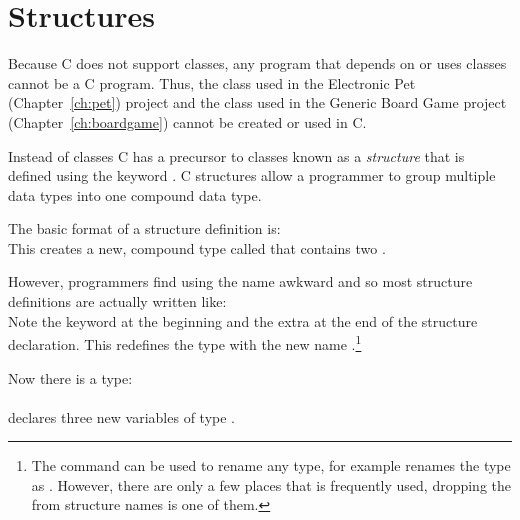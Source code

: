 \chapter{Structures}\label{appendix:structures}

Because C does not support classes, any program that depends on or uses classes cannot be a C program.   Thus, the  class used in the Electronic Pet (Chapter~\ref{ch:pet}) project and the   class used in the Generic Board Game project (Chapter~\ref{ch:boardgame}) cannot be created or used in C.  

Instead of classes C has a precursor to classes known as a \emph{structure} that is defined using the keyword .  C structures allow a programmer to group multiple data types into one compound data type. 

The basic format of a structure definition is:\\
This creates a new, compound type called  that contains two .

However, programmers find using the name  awkward and so most structure definitions are actually written like:\\
Note the keyword  at the beginning and the extra  at the end of the structure declaration.  This redefines the type  with the new name .\footnote{The  command can be used to rename any type, for example  renames the type  as .  However, there are only a few places that  is frequently used, dropping the  from structure names is one of them.}

Now there is a  type:\\
\\
declares three new variables of type .

